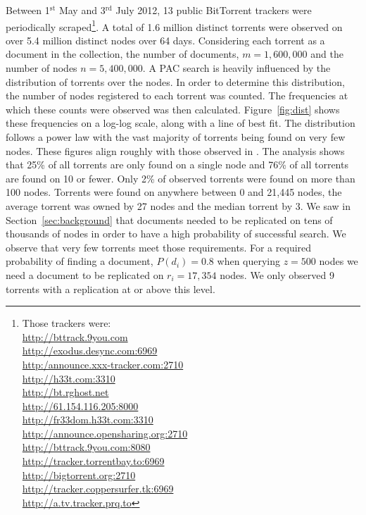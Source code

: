     Between 1$^{\textrm{st}}$ May and 3$^{\textrm{rd}}$ July 2012, 13 public BitTorrent trackers were periodically scraped\footnote{Those trackers were:\\
        \url{http://bttrack.9you.com}\\
        \url{http://exodus.desync.com:6969}\\
        \url{http:/announce.xxx-tracker.com:2710}\\
        \url{http://h33t.com:3310}\\
        \url{http://bt.rghost.net}\\
        \url{http://61.154.116.205:8000}\\
        \url{http://fr33dom.h33t.com:3310}\\
        \url{http://announce.opensharing.org:2710}\\
        \url{http://bttrack.9you.com:8080}\\
        \url{http://tracker.torrentbay.to:6969}\\
        \url{http://bigtorrent.org:2710}\\
        \url{http://tracker.coppersurfer.tk:6969}\\
        \url{http://a.tv.tracker.prq.to}
    }. A total of 1.6 million distinct torrents were observed on over 5.4 million distinct nodes over 64 days. Considering each torrent as a document in the collection, the number of documents, $m=1,600,000$ and the number of nodes $n=5,400,000$. A PAC search is heavily influenced by the distribution of torrents over the nodes. In order to determine this distribution, the number of nodes registered to each torrent was counted. The frequencies at which these counts were observed was then calculated. Figure~\ref{fig:dist} shows these frequencies on a log-log scale, along with a line of best fit. The distribution follows a power law with the vast majority of torrents being found on very few nodes. These figures align roughly with those observed in \cite{guo_measurements_2005,dan_power-law_2010}. The analysis shows that 25\% of all torrents are only found on a single node and 76\% of all torrents are found on 10 or fewer. Only 2\% of observed torrents were found on more than 100 nodes. Torrents were found on anywhere between 0 and 21,445 nodes, the average torrent was owned by 27 nodes and the median torrent by 3. We saw in Section~\ref{sec:background} that documents needed to be replicated on tens of thousands of nodes in order to have a high probability of successful search. We observe that very few torrents meet those requirements. For a required probability of finding a document, $P(d_i)=0.8$ when querying $z=500$ nodes we need a document to be replicated on $r_i=17,354$ nodes. We only observed 9 torrents with a replication at or above this level.

